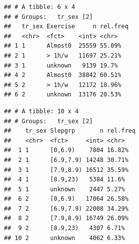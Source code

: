 \documentclass[]{article}
\newenvironment{Shaded}{\begin{snugshade}}{\end{snugshade}}
\newcommand{\DataTypeTok}[1]{\textcolor[rgb]{0.13,0.29,0.53}{#1}}
\newcommand{\DecValTok}[1]{\textcolor[rgb]{0.00,0.00,0.81}{#1}}
\newcommand{\KeywordTok}[1]{\textcolor[rgb]{0.13,0.29,0.53}{\textbf{#1}}}
\newcommand{\NormalTok}[1]{#1}
\newcommand{\OperatorTok}[1]{\textcolor[rgb]{0.81,0.36,0.00}{\textbf{#1}}}
\newcommand{\OtherTok}[1]{\textcolor[rgb]{0.56,0.35,0.01}{#1}}
\newcommand{\StringTok}[1]{\textcolor[rgb]{0.31,0.60,0.02}{#1}}
\begin{document}
\begin{verbatim}
## # A tibble: 6 x 4
## # Groups:   tr_sex [2]
##   tr_sex Exercise     n rel.freq
##   <chr>  <fct>    <int> <chr>   
## 1 1      Almost0  25559 55.09%  
## 2 1      > 1h/w   11697 25.21%  
## 3 1      unknown   9139 19.7%   
## 4 2      Almost0  38842 60.51%  
## 5 2      > 1h/w   12172 18.96%  
## 6 2      unknown  13176 20.53%
\end{verbatim}

\begin{Shaded}
\end{Shaded}

\begin{verbatim}
## # A tibble: 10 x 4
## # Groups:   tr_sex [2]
##    tr_sex Slepgrp       n rel.freq
##    <chr>  <fct>     <int> <chr>   
##  1 1      [0,6.9)    7804 16.82%  
##  2 1      [6.9,7.9) 14248 30.71%  
##  3 1      [7.9,8.9) 16512 35.59%  
##  4 1      [8.9,23)   5384 11.6%   
##  5 1      unknown    2447 5.27%   
##  6 2      [0,6.9)   17064 26.58%  
##  7 2      [6.9,7.9) 22008 34.29%  
##  8 2      [7.9,8.9) 16749 26.09%  
##  9 2      [8.9,23)   4307 6.71%   
## 10 2      unknown    4062 6.33%
\end{verbatim}

\begin{Shaded}
\end{Shaded}
\end{document}
